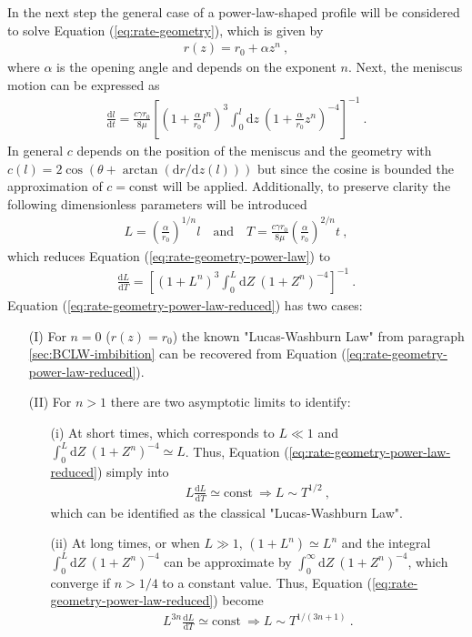 \documentclass[aip, amsmath, amssymb, reprint, twocolumn, floatfix]{revtex4-1}
\newcommand{\dldt}{\frac{\mathrm{d}l}{\mathrm{d}t}}
\newcommand{\dLdT}{\frac{\mathrm{d}L}{\mathrm{d}T}}
\newcommand{\dz}{\mathrm{d}z}
\newcommand{\dZ}{\mathrm{d}Z}
\begin{document}
In the next step the general case of a power-law-shaped profile will be considered to solve Equation (\ref{eq:rate-geometry}), which is given by
\begin{gather}
	r(z) = r_0 + \alpha z^n~,
	\label{eq:power-law}
\end{gather}
where $\alpha$ is the opening angle and depends on the exponent $n$. Next, the meniscus motion can be expressed as 
\begin{gather}
	\dldt = \frac{c \gamma r_0}{8\mu} \left[ \left(1 + \frac{\alpha}{r_0} l^n \right)^3 \int_0^{l}\!\!\!\dz~\left(1 + \frac{\alpha}{r_0} z^n \right)^{-4} \right]^{-1}~.
	\label{eq:rate-geometry-power-law}
\end{gather}
In general $c$ depends on the position of the meniscus and the geometry with $c(l) = 2\cos(\theta + \arctan(\mathrm{d}r/\mathrm{d}z(l)))$ but since the cosine is bounded the approximation of $c = \text{const}$ will be applied. Additionally, to preserve clarity the following dimensionless parameters will be introduced
\begin{gather}
	L = \left(\frac{\alpha}{r_0}\right)^{1/n} l\quad\text{and}\quad T = \frac{c\gamma r_0}{8\mu} \left(\frac{\alpha}{r_0}\right)^{2/n} t~,
\end{gather}
which reduces Equation (\ref{eq:rate-geometry-power-law}) to
\begin{gather}
	\dLdT = \left[ \left(1 + L^n \right)^3 \int_0^{L}\!\!\!\dZ~\left(1 + Z^n \right)^{-4} \right]^{-1}~.
	\label{eq:rate-geometry-power-law-reduced}
\end{gather}
Equation (\ref{eq:rate-geometry-power-law-reduced}) has two cases:
\begin{itemize}
	\item[(I)] For $n = 0$ ($r(z) = r_0$) the known "Lucas-Washburn Law" from paragraph \ref{sec:BCLW-imbibition} can be recovered from Equation (\ref{eq:rate-geometry-power-law-reduced}).
	\item[(II)] For $n > 1$ there are two asymptotic limits to identify:
	\begin{itemize}
		\item[(i)] At short times, which corresponds to $L \ll 1$ and $\int_0^{L}\!\dZ~\left(1 + Z^n \right)^{-4} \simeq L$. Thus, Equation (\ref{eq:rate-geometry-power-law-reduced}) simply into
		\begin{gather}
			L \dLdT \simeq \text{const}~ \Rightarrow \boxed{L \sim T^{1/2}}~,
		\end{gather}
		which can be identified as the classical "Lucas-Washburn Law".
		\item[(ii)]  At long times, or when $L \gg 1$, $(1+L^n) \simeq L^n$ and the integral $\int_0^{L}\!\!\!\dZ~\left(1 + Z^n \right)^{-4}$ can be approximate by $\int_0^{\infty}\!\dZ~\left(1 + Z^n \right)^{-4}$, which converge if $n > 1/4$ to a constant value. Thus, Equation (\ref{eq:rate-geometry-power-law-reduced}) become
		\begin{gather}
			L^{3n} \dLdT \simeq \text{const}~\Rightarrow \boxed{L \sim T^{1/(3n+1)}}~.
		\end{gather}
	\end{itemize}
\end{itemize}
\end{document}
